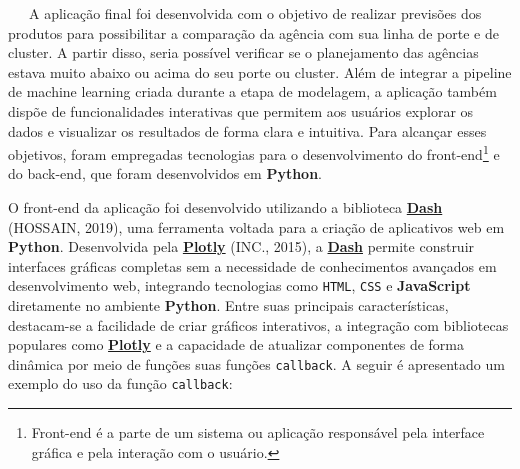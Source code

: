 \documentclass[
  12pt,
  a4paper,
]{scrreprt}
\begin{document}
~~~A aplicação final foi desenvolvida com o objetivo de realizar
previsões dos produtos para possibilitar a comparação da agência com sua
linha de porte e de cluster. A partir disso, seria possível verificar se
o planejamento das agências estava muito abaixo ou acima do seu porte ou
cluster. Além de integrar a pipeline de machine learning criada durante
a etapa de modelagem, a aplicação também dispõe de funcionalidades
interativas que permitem aos usuários explorar os dados e visualizar os
resultados de forma clara e intuitiva. Para alcançar esses objetivos,
foram empregadas tecnologias para o desenvolvimento do
front-end\footnote{Front-end é a parte de um sistema ou aplicação
  responsável pela interface gráfica e pela interação com o usuário.} e
do back-end, que foram desenvolvidos em \textbf{Python}.

\vspace{12pt}

O front-end da aplicação foi desenvolvido utilizando a biblioteca
\href{https://dash.plotly.com/}{\textbf{Dash}} (HOSSAIN, 2019), uma
ferramenta voltada para a criação de aplicativos web em \textbf{Python}.
Desenvolvida pela \href{https://plotly.com/}{\textbf{Plotly}} (INC.,
2015), a \href{https://dash.plotly.com/}{\textbf{Dash}} permite
construir interfaces gráficas completas sem a necessidade de
conhecimentos avançados em desenvolvimento web, integrando tecnologias
como \texttt{HTML}, \texttt{CSS} e \textbf{JavaScript} diretamente no
ambiente \textbf{Python}. Entre suas principais características,
destacam-se a facilidade de criar gráficos interativos, a integração com
bibliotecas populares como \href{https://plotly.com/}{\textbf{Plotly}} e
a capacidade de atualizar componentes de forma dinâmica por meio de
funções suas funções \texttt{callback}. A seguir é apresentado um
exemplo do uso da função \texttt{callback}:
\end{document}
